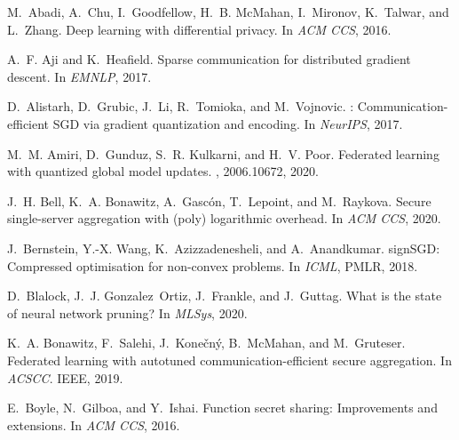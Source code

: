 \documentclass[11pt]{article}
\begin{document}



\begin{thebibliography}{10}
\setlength{\itemsep}{1pt}
\begin{small}
M.~Abadi, A.~Chu, I.~Goodfellow, H.~B. McMahan, I.~Mironov, K.~Talwar, and
  L.~Zhang.
\newblock Deep learning with differential privacy.
\newblock In {\em ACM CCS}, 2016.

A.~F. Aji and K.~Heafield.
\newblock Sparse communication for distributed gradient descent.
\newblock In {\em EMNLP}, 2017.

D.~Alistarh, D.~Grubic, J.~Li, R.~Tomioka, and M.~Vojnovic.
: {C}ommunication-efficient {SGD} via gradient quantization and
  encoding.
\newblock In {\em NeurIPS}, 2017.

M.~M. Amiri, D.~Gunduz, S.~R. Kulkarni, and H.~V. Poor.
\newblock Federated learning with quantized global model updates.
, 2006.10672, 2020.

J.~H. Bell, K.~A. Bonawitz, A.~Gasc{\'o}n, T.~Lepoint, and M.~Raykova.
\newblock Secure single-server aggregation with (poly) logarithmic overhead.
\newblock In {\em ACM CCS}, 2020.

J.~Bernstein, Y.-X. Wang, K.~Azizzadenesheli, and A.~Anandkumar.
\newblock sign{SGD}: {C}ompressed optimisation for non-convex problems.
\newblock In {\em ICML}, PMLR, 2018.

D.~Blalock, J.~J. Gonzalez~Ortiz, J.~Frankle, and J.~Guttag.
\newblock What is the state of neural network pruning?
\newblock In {\em MLSys}, 2020.

K.~A. Bonawitz, F.~Salehi, J.~Kone{\v{c}}n{\'y}, B.~McMahan, and M.~Gruteser.
\newblock Federated learning with autotuned communication-efficient secure
  aggregation.
\newblock In {\em ACSCC}. {IEEE}, 2019.

E.~Boyle, N.~Gilboa, and Y.~Ishai.
\newblock Function secret sharing: Improvements and extensions.
\newblock In {\em ACM CCS}, 2016.


\end{small}
\end{thebibliography}
\end{document}

